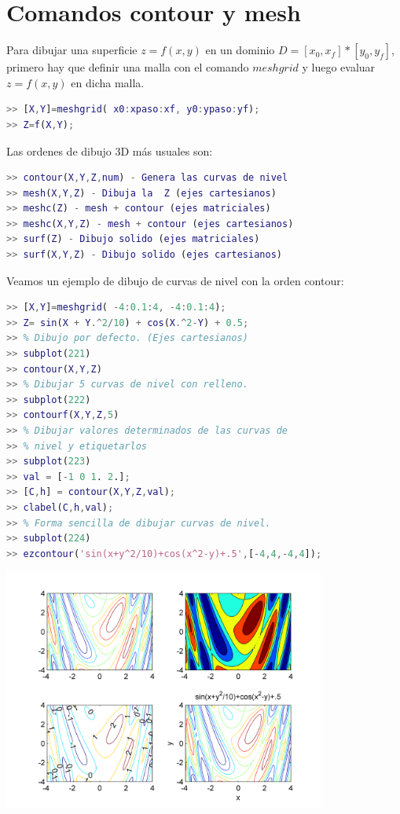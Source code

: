 \section{Comandos contour y mesh}
Para dibujar una superficie $z = f(x,y)$ en un dominio $D = [x_{0}, x_{f}] * [y_{0}, y_{f}]$, primero hay que definir una malla con el comando $meshgrid$ y luego evaluar $z = f(x, y)$ en dicha malla.
\begin{lstlisting}[language=Matlab]
>> [X,Y]=meshgrid( x0:xpaso:xf, y0:ypaso:yf);
>> Z=f(X,Y);
\end{lstlisting}

Las ordenes de dibujo 3D más usuales son:
\begin{lstlisting}[language=Matlab]
>> contour(X,Y,Z,num) - Genera las curvas de nivel
>> mesh(X,Y,Z) - Dibuja la  Z (ejes cartesianos)
>> meshc(Z) - mesh + contour (ejes matriciales)
>> meshc(X,Y,Z) - mesh + contour (ejes cartesianos)
>> surf(Z) - Dibujo solido (ejes matriciales)
>> surf(X,Y,Z) - Dibujo solido (ejes cartesianos)
\end{lstlisting}

Veamos un ejemplo de dibujo de curvas de nivel con la orden contour:
\begin{lstlisting}[language=Matlab]
>> [X,Y]=meshgrid( -4:0.1:4, -4:0.1:4);
>> Z= sin(X + Y.^2/10) + cos(X.^2-Y) + 0.5;
>> % Dibujo por defecto. (Ejes cartesianos)
>> subplot(221)
>> contour(X,Y,Z)
>> % Dibujar 5 curvas de nivel con relleno.
>> subplot(222)
>> contourf(X,Y,Z,5)
>> % Dibujar valores determinados de las curvas de
>> % nivel y etiquetarlos
>> subplot(223)
>> val = [-1 0 1. 2.];
>> [C,h] = contour(X,Y,Z,val);
>> clabel(C,h,val);
>> % Forma sencilla de dibujar curvas de nivel.
>> subplot(224)
>> ezcontour('sin(x+y^2/10)+cos(x^2-y)+.5',[-4,4,-4,4]);
\end{lstlisting}
\begin{center}
\includegraphics[width=300pt]{./Imagenes/3d2.png}
\end{center}

